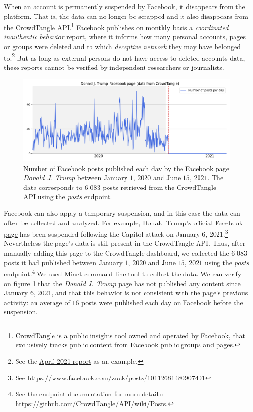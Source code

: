 \documentclass{article}
\begin{document}
When an account is permanently suspended by Facebook, it disappears from the platform. That is,  the data can no longer be scrapped and it also disappears from the CrowdTangle API.\footnote{CrowdTangle is a public insights tool owned and operated by Facebook, that exclusively tracks public content from Facebook public groups and pages.} Facebook publishes on monthly basis a {\it coordinated inauthentic behavior} report, where it informs how many personal accounts, pages or groups were deleted and to which {\it deceptive network} they may have belonged to.\footnote{See the \href{https://about.fb.com/news/2021/05/april-2021-coordinated-inauthentic-behavior-report/}{April 2021 report} as an example.} But as long as external persons do not have access to deleted accounts data, these reports cannot be verified by independent researchers or journalists.

\begin{figure}[h]
	\centering
			\includegraphics[scale=0.4]{../figure/facebook_crowdtangle_trump.png}
	\caption{Number of Facebook posts published each day by the Facebook page {\it Donald J. Trump} between January $1$, $2020$ and June $15$, $2021$. The data corresponds to $6$ $083$ posts retrieved from the CrowdTangle API using the {\it posts} endpoint.}
	\label{fig1_fb}
\end{figure}

Facebook can also apply a temporary suspension, and in this case the data can often be collected and analyzed. For example, \href{https://www.facebook.com/DonaldTrump/}{Donald Trump’s official Facebook page}  has been suspended following the Capitol attack on January 6, 2021.\footnote{See \href{https://www.facebook.com/zuck/posts/10112681480907401}{https://www.facebook.com/zuck/posts/10112681480907401}} Nevertheless the page’s data is still present in the CrowdTangle API. Thus, after manually adding this page to the CrowdTangle dashboard, we collected the $6$ $083$ posts it had published between January $1$, $2020$ and June $15$, $2021$ using the {\it posts} endpoint.\footnote{See the endpoint documentation for more details: \href{https://github.com/CrowdTangle/API/wiki/Posts}{https://github.com/CrowdTangle/API/wiki/Posts}.} We used Minet command line tool \cite{minet} to collect the data. We can verify on figure \ref{fig1_fb} that the {\it Donald J. Trump} page has not published any content since January $6$, 2021, and that this behavior is not consistent with the page’s previous activity: an average of $16$ posts were published each day on Facebook before the suspension. 
\end{document}
